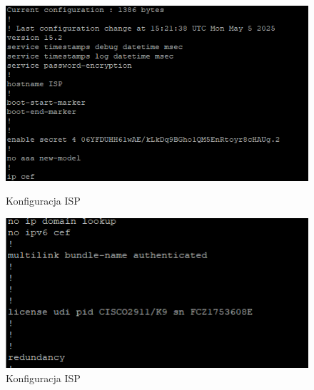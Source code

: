 \documentclass[12pt,twoside,a4paper,openany]{article}
\begin{document}
\begin{figure}[h]
    \centering
    \begin{minipage}{0.49\textwidth}
        \centering
        \includegraphics[width=\textwidth]{Kaleta part 2/ISP/1.png}
        \caption{Konfiguracja ISP}
        \label{fig:ISP-1}
    \end{minipage}
    \hfill
    \begin{minipage}{0.49\textwidth}
        \centering
        \includegraphics[width=\textwidth]{Kaleta part 2/ISP/2.png}
        \caption{Konfiguracja ISP}
        \label{fig:ISP-2}
    \end{minipage}
\end{figure}
\end{document}
